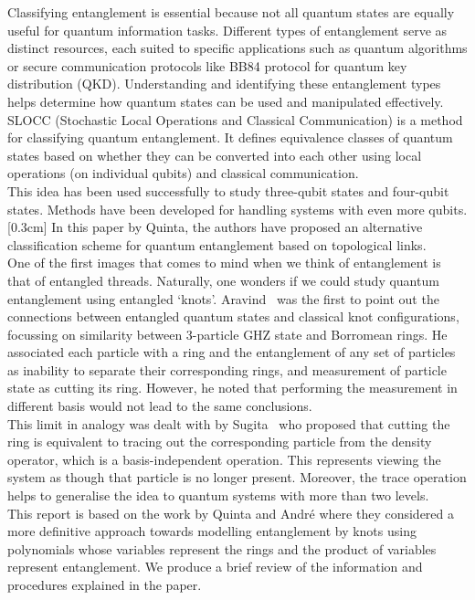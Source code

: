 \documentclass{scrartcl}
\begin{document}
Classifying entanglement is essential because not all quantum states are equally useful for quantum information tasks. Different types of entanglement serve as distinct resources, each suited to specific applications such as quantum algorithms or secure communication protocols like BB84 protocol for quantum key distribution (QKD). Understanding and identifying these entanglement types helps determine how quantum states can be used and manipulated effectively.\\[0.3cm]
SLOCC (Stochastic Local Operations and Classical Communication) is a method for classifying quantum entanglement. It defines equivalence classes of quantum states based on whether they can be converted into each other using local operations (on individual qubits) and classical communication.\\[0.3cm]
This idea has been used successfully to study three-qubit states and four-qubit states. Methods have been developed for handling systems with even more qubits.[0.3cm]
In this paper by Quinta\cite{Quinta2018}, the authors have proposed an alternative classification scheme for quantum entanglement based on topological links.\\[0.3cm]
One of the first images that comes to mind when we think of entanglement is that of entangled threads. Naturally, one wonders if we could study quantum entanglement using entangled `knots'. Aravind~\cite{Aravind1997} was the first to point out the connections between entangled quantum states and classical knot configurations, focussing on similarity between 3-particle GHZ state and Borromean rings. He associated each particle with a ring and the entanglement of any set of particles as inability to separate their corresponding rings, and measurement of particle state as cutting its ring. However, he noted that performing the measurement in different basis would not lead to the same conclusions.\\[0.3cm] This limit in analogy was dealt with by Sugita~\cite{Sugita2007-ko} who proposed that cutting the ring is equivalent to tracing out the corresponding particle from the density operator, which is a basis-independent operation. This represents viewing the system as though that particle is no longer present. Moreover, the trace operation helps to generalise the idea to quantum systems with more than two levels.  \\[0.3cm]
This report is based on the work by Quinta and André \cite{Quinta2018} where they considered a more definitive approach towards modelling entanglement by knots using polynomials whose variables represent the rings and the product of variables represent entanglement. We produce a brief review of the information and procedures explained in the paper.
\end{document}
